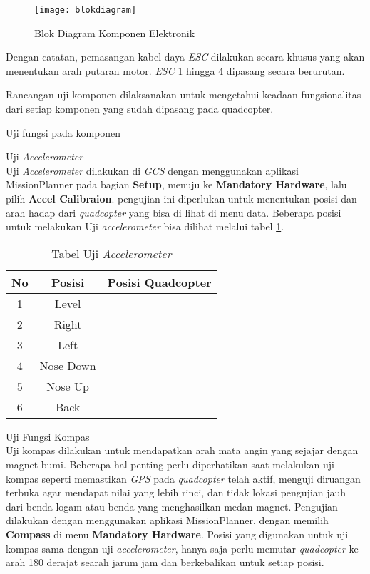 \begin{figure}[H]
	\centering
	\texttt{[image: blokdiagram]}
	\caption{Blok Diagram Komponen Elektronik}
	\label{fig:blokdiagram}
\end{figure}

Dengan catatan, pemasangan kabel daya \textit{ESC} dilakukan secara khusus yang akan menentukan arah putaran motor.  \textit{ESC} 1 hingga 4 dipasang secara berurutan. 

Rancangan uji komponen dilaksanakan untuk mengetahui keadaan fungsionalitas dari setiap komponen yang sudah dipasang pada quadcopter.

\begin{packed_item}
	\item Uji fungsi pada komponen
	\begin{packed_item}
		\item [a.] Uji \textit{Accelerometer}
		\\ Uji \textit{Accelerometer} dilakukan di \textit{GCS} dengan menggunakan aplikasi MissionPlanner pada bagian \textbf{Setup}, menuju ke \textbf{Mandatory Hardware}, lalu pilih \textbf{Accel Calibraion}. pengujian ini diperlukan untuk menentukan posisi dan arah hadap dari \textit{quadcopter} yang bisa di lihat di menu data. Beberapa posisi untuk melakukan Uji \textit{accelerometer} bisa dilihat melalui tabel \cref{tab:ujiaccel}.
		\begin{table}[h]
			\caption{Tabel Uji \textit{Accelerometer}}
			\centering
			\begin{tabular}{|c|c|c|}
				\hline
				\textbf{No} & \textbf{Posisi}    & \textbf{Posisi Quadcopter} \\ \hline
				1  & Level     &                   \\ \hline
				2  & Right     &                   \\ \hline
				3  & Left      &                   \\ \hline
				4  & Nose Down &                   \\ \hline
				5  & Nose Up   &                   \\ \hline
				6  & Back      &                   \\ \hline
			\end{tabular}
			\label{tab:ujiaccel}
		\end{table}
		
		\item [b.] Uji Fungsi Kompas
		\\ Uji kompas dilakukan untuk mendapatkan arah mata angin yang sejajar dengan magnet bumi. Beberapa hal penting perlu diperhatikan saat melakukan uji kompas seperti memastikan \textit{GPS} pada \textit{quadcopter} telah aktif, menguji diruangan terbuka agar mendapat nilai yang lebih rinci, dan tidak lokasi pengujian jauh dari benda logam atau benda yang menghasilkan medan magnet.
		Pengujian dilakukan dengan menggunakan aplikasi MissionPlanner, dengan memilih \textbf{Compass} di menu \textbf{Mandatory Hardware}. Posisi yang digunakan untuk uji kompas sama dengan uji \textit{accelerometer}, hanya saja perlu memutar \textit{quadcopter} ke arah 180 derajat searah jarum jam dan berkebalikan untuk setiap posisi.
		

\end{packed_item}
\end{packed_item}
